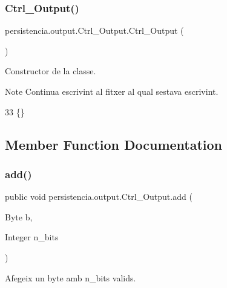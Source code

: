 \subsubsection{\texorpdfstring{Ctrl\+\_\+\+Output()}{Ctrl\_Output()}\hspace{0.1cm}{\footnotesize\ttfamily [2/2]}}
{\footnotesize\ttfamily persistencia.\+output.\+Ctrl\+\_\+\+Output.\+Ctrl\+\_\+\+Output (\begin{DoxyParamCaption}{ }\end{DoxyParamCaption})\hspace{0.3cm}{\ttfamily [inline]}}



Constructor de la classe. 

\begin{DoxyNote}{Note}
Continua escrivint al fitxer al qual s\textquotesingle{}estava escrivint. 
\end{DoxyNote}

\begin{DoxyCode}
33 \{\}
\end{DoxyCode}


\subsection{Member Function Documentation}
\mbox{\label{classpersistencia_1_1output_1_1Ctrl__Output_a8c5aa5a6acb5259faeb1c05c71ddd21c}} 
\subsubsection{\texorpdfstring{add()}{add()}\hspace{0.1cm}{\footnotesize\ttfamily [1/6]}}
{\footnotesize\ttfamily public void persistencia.\+output.\+Ctrl\+\_\+\+Output.\+add (\begin{DoxyParamCaption}\item[{Byte}]{b,  }\item[{Integer}]{n\+\_\+bits }\end{DoxyParamCaption})\hspace{0.3cm}{\ttfamily [inline]}}



Afegeix un byte amb n\+\_\+bits valids. 


